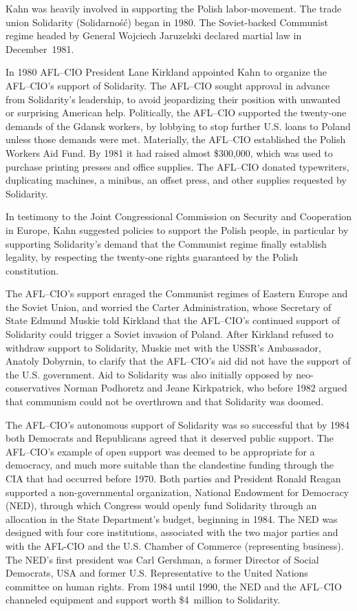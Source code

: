 Kahn was heavily involved in supporting the Polish labor-movement. The
trade union Solidarity (Solidarność) began in 1980. The Soviet-backed
Communist regime headed by General Wojciech Jaruzelski declared martial
law in December~1981.

In 1980 AFL--CIO President Lane Kirkland appointed Kahn to organize the
AFL--CIO's support of Solidarity. The AFL--CIO sought approval in
advance from Solidarity's leadership, to avoid jeopardizing their
position with unwanted or surprising American help. Politically, the
AFL--CIO supported the twenty-one demands of the Gdansk workers, by
lobbying to stop further U.S. loans to Poland unless those demands were
met. Materially, the AFL--CIO established the Polish Workers Aid Fund.
By 1981 it had raised almost \$300,000, which was used to purchase
printing presses and office supplies. The AFL--CIO donated typewriters,
duplicating machines, a minibus, an offset press, and other supplies
requested by Solidarity.

In testimony to the Joint Congressional Commission on Security and
Cooperation in Europe, Kahn suggested policies to support the Polish
people, in particular by supporting Solidarity's demand that the
Communist regime finally establish legality, by respecting the
twenty-one rights guaranteed by the Polish constitution.

The AFL--CIO's support enraged the Communist regimes of Eastern Europe
and the Soviet Union, and worried the Carter Administration, whose
Secretary of State Edmund Muskie told Kirkland that the AFL--CIO's
continued support of Solidarity could trigger a Soviet invasion of
Poland. After Kirkland refused to withdraw support to Solidarity, Muskie
met with the USSR's Ambassador, Anatoly Dobyrnin, to clarify that the
AFL--CIO's aid did not have the support of the U.S. government. Aid to
Solidarity was also initially opposed by neo-conservatives Norman
Podhoretz and Jeane Kirkpatrick, who before 1982 argued that communism
could not be overthrown and that Solidarity was doomed.

The AFL--CIO's autonomous support of Solidarity was so successful that
by 1984 both Democrats and Republicans agreed that it deserved public
support. The AFL--CIO's example of open support was deemed to be
appropriate for a democracy, and much more suitable than the clandestine
funding through the CIA that had occurred before 1970. Both parties and
President Ronald Reagan supported a non-governmental organization,
National Endowment for Democracy (NED), through which Congress would
openly fund Solidarity through an allocation in the State Department's
budget, beginning in 1984. The NED was designed with four core
institutions, associated with the two major parties and with the AFL-CIO
and the U.S. Chamber of Commerce (representing business). The NED's
first president was Carl Gershman, a former Director of Social
Democrats, USA and former U.S. Representative to the United Nations
committee on human rights. From 1984 until 1990, the NED and the
AFL--CIO channeled equipment and support worth \$4~million to
Solidarity.

